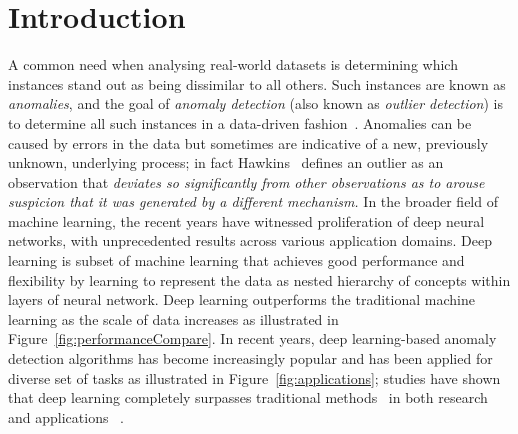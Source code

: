 \section{Introduction}
A common need when analysing real-world datasets is determining which instances stand out as being dissimilar to all others. Such instances are known as \emph{anomalies}, and the goal of \emph{anomaly detection} (also known as \emph{outlier detection}) is to determine all such instances in a data-driven fashion~\cite{chandola2007outlier}. Anomalies can be caused by errors in the data but sometimes are indicative of a new, previously unknown, underlying process; in fact Hawkins~\cite{hawkins} defines an outlier as an observation that {\it deviates so significantly from other observations as to arouse suspicion that it was generated by a different mechanism.} In the broader field of machine learning, the recent years have witnessed proliferation of deep neural networks, with unprecedented results across various application domains. Deep learning is subset of machine learning that achieves good performance and flexibility by learning to represent the data as nested hierarchy of concepts within layers of neural network. Deep learning outperforms the traditional machine learning as the scale of data increases as illustrated in Figure~\ref{fig:performanceCompare}. In recent years, deep learning-based anomaly detection algorithms has become increasingly popular and has been applied for diverse set of tasks as illustrated in Figure~\ref{fig:applications}; studies have shown that deep learning
completely surpasses traditional methods~\cite{javaid2016deep,peng2015multi}  in both research and applications ~\cite{javaid2016deep}.


